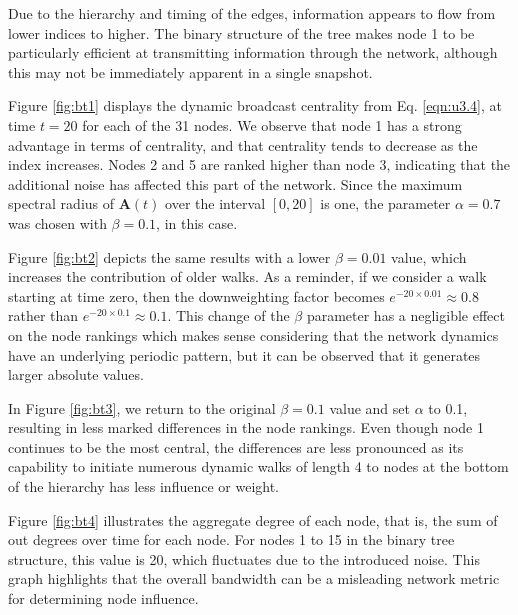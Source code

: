 Due to the hierarchy and timing of the edges, information appears to flow from lower indices to higher. The binary structure of the tree makes node 1 to be particularly efficient at transmitting information through the network, although this may not be immediately apparent in a single snapshot.

Figure \ref{fig:bt1} displays the dynamic broadcast centrality from Eq. \ref{eqn:u3.4}, at time $t=20$ for each of the 31 nodes. We observe that node 1 has a strong advantage in terms of centrality, and that centrality tends to decrease as the index increases. Nodes 2 and 5 are ranked higher than node 3, indicating that the additional noise has affected this part of the network. Since the maximum spectral radius of $\mathbf{A}(t)$ over the interval $[0, 20]$ is one, the parameter $\alpha=0.7$ was chosen with $\beta=0.1$, in this case.

Figure \ref{fig:bt2} depicts the same results with a lower $\beta=0.01$ value, which increases the contribution of older walks. As a reminder, if we consider a walk starting at time zero, then the  downweighting factor becomes $e^{−20 \times 0.01} \approx 0.8$ rather than $e^{−20 \times 0.1} \approx 0.1$. This change of the $\beta$ parameter has a negligible effect on the node rankings which makes sense considering that the network dynamics have an underlying periodic pattern, but it can be observed that it generates larger absolute values.

In Figure \ref{fig:bt3}, we return to the original $\beta=0.1$ value and set $\alpha$ to 0.1, resulting in less marked differences in the node rankings. Even though node 1 continues to be the most central, the differences are less pronounced as its capability to initiate numerous dynamic walks of length 4 to nodes at the bottom of the hierarchy has less influence or weight.

Figure \ref{fig:bt4} illustrates the aggregate degree of each node, that is, the sum of out degrees over time for each node. For nodes 1 to 15 in the binary tree structure, this value is 20, which fluctuates due to the introduced noise. This graph highlights that the overall bandwidth can be a misleading network metric for determining node influence.

